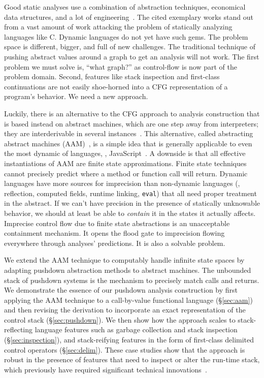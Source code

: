 Good static analyses use a combination of abstraction techniques, economical data structures, and a lot of engineering~\citep{ianjohnson:CousotEtAl-TASE07,ianjohnson:DBLP:journals/ipl/YiCKK07}.
%
The cited exemplary works stand out from a vast amount of work attacking the problem of statically analyzing languages like C.
%
Dynamic languages do not yet have such gems.
%
The problem space is different, bigger, and full of new challenges.
%
The traditional technique of pushing abstract values around a graph to get an analysis will not work.
%
The first problem we must solve is, ``what graph?'' as control-flow is now part of the problem domain.
%
Second, features like stack inspection and first-class continuations are not easily shoe-horned into a CFG representation of a program's behavior.
%
We need a new approach. %

%
Luckily, there is an alternative to the CFG approach to analysis construction that is based instead on abstract machines, which are one step away from interpreters; they are interderivable in several instances~\citep{ianjohnson:DBLP:conf/icfp/Danvy08}.
%
This alternative, called abstracting abstract machines
(AAM)~\citep{dvanhorn:VanHorn2012Systematic}, is a simple
idea that is generally applicable to even the most dynamic of
languages, \eg{},
JavaScript~\citep{ianjohnson:DBLP:journals/corr/KashyapDKWGSWH14}.
%
A downside is that all effective instantiations of AAM are finite state approximations.
%
Finite state techniques cannot precisely predict where a method or function call will return.
%
Dynamic languages have more sources for imprecision than non-dynamic languages (\eg{}, reflection, computed fields, runtime linking, {\tt eval}) that all need proper treatment in the abstract.
%
If we can't have precision in the presence of statically unknowable behavior, we should at least be able to \emph{contain} it in the states it actually affects.
%
Imprecise control flow due to finite state abstractions is an unacceptable containment mechanism.
%
It opens the flood gate to imprecision flowing everywhere through analyses' predictions.
%
It is also a solvable problem.
%

%
We extend the AAM technique to computably handle infinite state spaces by adapting pushdown abstraction methods to abstract machines.
%
The unbounded stack of pushdown systems is the mechanism to precisely match calls and returns.
%
We demonstrate the essence of our pushdown analysis construction by
first applying the AAM technique to a call-by-value functional
language (\S\ref{sec:aam}) and then revising the derivation to
incorporate an exact representation of the control stack
(\S\ref{sec:pushdown}).  We then show how the approach scales to
stack-reflecting language features such as garbage collection and
stack inspection (\S\ref{sec:inspection}), and stack-reifying features
in the form of first-class delimited control operators (\S\ref{sec:delim}).
%
These case studies show that the approach is robust in the presence of
features that need to inspect or alter the run-time stack, which
previously have required significant technical
innovations~\cite{ianjohnson:Vardoulakis2011Pushdown,ianjohnson:DBLP:journals/jfp/JohnsonSEMH14}.

